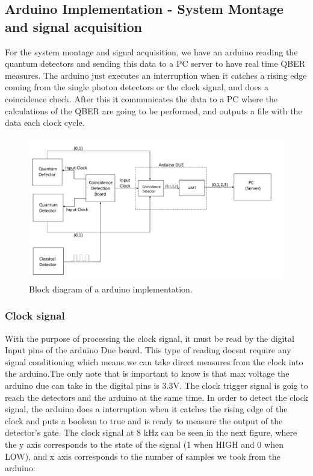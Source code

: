 \begin{refsection}
\begin{itemize}
	\end{itemize}
	
	\clearpage
	
	\subsection{Arduino Implementation - System Montage and signal acquisition}
	For the system montage and signal acquisition, we have an arduino reading the quantum detectors and sending this data to a PC server to have real time QBER measures. The arduino just executes an interruption when it catches a rising edge coming from the single photon detectors or the clock signal, and does a coincidence check. After this it communicates the data to a PC where the calculations of the QBER are going to be performed, and outputs a file with the data each clock cycle. 
	
	\begin{figure}[H]
		\centering
		\includegraphics[width=1.1\linewidth]{./sdf/arduino_quantum_rx/figures/DiagramaGeralArduino.pdf}
		\caption{Block diagram of a arduino implementation.}
		\label{fig:netxpto}
	\end{figure}
	
	
	\vspace{15px}
	\subsubsection{Clock signal}
	
	With the purpose of processing the clock signal, it must be read by the digital Input pins of the arduino Due board. This type of reading doesnt require any signal conditioning which means we can take direct measures from the clock into the arduino.The only note that is important to know is that max voltage the arduino due can take in the digital pins is 3.3V. The clock trigger signal is goig to reach the detectors and the arduino at the same time. In order to detect the clock signal, the arduino does a interruption when it catches the rising edge of the clock and puts a boolean to true and is ready to measure the output of the detector's gate.
   \clearpage
   The clock signal at 8 kHz can be seen in the next figure, where the y axis corresponds to the state of the signal (1 when HIGH and 0 when LOW), and x axis corresponds to the number of samples we took from the arduino:
   

\end{refsection}
